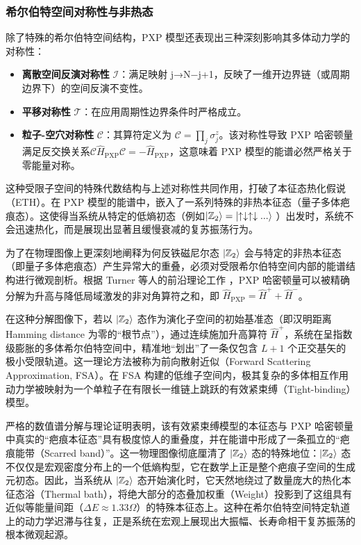 \documentclass[../main.tex]{subfiles}
\begin{document}
\subsubsection{希尔伯特空间对称性与非热态}

除了特殊的希尔伯特空间结构，PXP 模型还表现出三种深刻影响其多体动力学的对称性：
\begin{itemize}
    \item \textbf{离散空间反演对称性} $\mathcal{I}$：满足映射 j→N−j+1，反映了一维开边界链（或周期边界下）的空间反演不变性。
    \item \textbf{平移对称性} $\mathcal{T}$：在应用周期性边界条件时严格成立。
    \item \textbf{粒子-空穴对称性} $\mathcal{C}$：其算符定义为 $\mathcal{C}=\prod_j \sigma_j^z$。该对称性导致 PXP 哈密顿量满足反交换关系$\mathcal{C}\hat{H}_\text{PXP}\mathcal{C}=-\hat{H}_\text{PXP}$，这意味着 PXP 模型的能谱必然严格关于零能量对称。
\end{itemize}

这种受限子空间的特殊代数结构与上述对称性共同作用，打破了本征态热化假说（ETH）\cite{deutsch1991quantum, srednicki1994chaos, rigol2008thermalization}。在 PXP 模型的能谱中，嵌入了一系列特殊的非热本征态（量子多体疤痕态）。这使得当系统从特定的低熵初态（例如$\ket{\mathbb{Z}_2}=\ket{\uparrow\downarrow\uparrow\downarrow...}$ ）出发时，系统不会迅速热化，而是展现出显著且缓慢衰减的复苏振荡行为\cite{bernien2017probing,turner2018weak,serbyn2021quantum,bluvstein2021controlling,desaules2024ergodicity}。
 


为了在物理图像上更深刻地阐释为何反铁磁尼尔态 $\ket{\mathbb{Z}_2}$ 会与特定的非热本征态（即量子多体疤痕态）产生异常大的重叠，必须对受限希尔伯特空间内部的能谱结构进行微观剖析。根据 Turner 等人的前沿理论工作 \cite{turner2018weak}，PXP 哈密顿量可以被精确分解为升高与降低局域激发的非对角算符之和，即 $\hat{H}_{\text{PXP}} = \hat{H}^+ + \hat{H}^-$。

在这种分解图像下，若以 $\ket{\mathbb{Z}_2}$ 态作为演化子空间的初始基准态（即汉明距离 Hamming distance 为零的“根节点”），通过连续施加升高算符 $\hat{H}^+$，系统在呈指数级膨胀的多体希尔伯特空间中，精准地“划出”了一条仅包含 $L+1$ 个正交基矢的极小受限轨道。这一理论方法被称为前向散射近似（Forward Scattering Approximation, FSA）。在 FSA 构建的低维子空间内，极其复杂的多体相互作用动力学被映射为一个单粒子在有限长一维链上跳跃的有效紧束缚（Tight-binding）模型。

严格的数值谱分解与理论证明表明，该有效紧束缚模型的本征态与 PXP 哈密顿量中真实的“疤痕本征态”具有极度惊人的重叠度，并在能谱中形成了一条孤立的“疤痕能带（Scarred band）”。这一物理图像彻底厘清了 $\ket{\mathbb{Z}_2}$ 态的特殊地位：$\ket{\mathbb{Z}_2}$ 态不仅仅是宏观密度分布上的一个低熵构型，它在数学上正是整个疤痕子空间的生成元初态。因此，当系统从 $\ket{\mathbb{Z}_2}$ 态开始演化时，它天然地绕过了数量庞大的热化本征态浴（Thermal bath），将绝大部分的态叠加权重（Weight）投影到了这组具有近似等能量间距（$\Delta E \approx 1.33\Omega$）的特殊本征态上。这种在希尔伯特空间特定轨道上的动力学迟滞与往复，正是系统在宏观上展现出大振幅、长寿命相干复苏振荡的根本微观起源。
\end{document}
